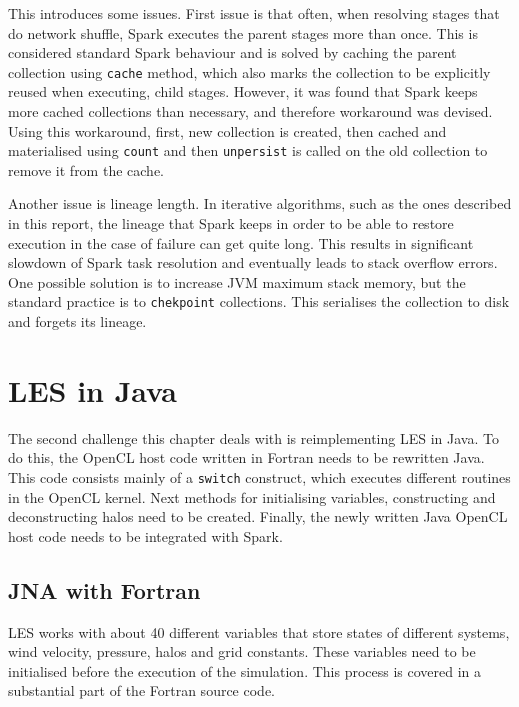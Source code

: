 \documentclass{l4proj}
\begin{document}
This introduces some issues. First issue is that often, when resolving stages that
do network shuffle, Spark executes the parent stages more than once. This is
considered standard Spark behaviour and is solved by caching the parent collection
using \texttt{cache} method, which also marks the collection to be explicitly reused
when executing, child stages. However, it was found that Spark keeps more cached collections
than necessary, and therefore workaround was devised. Using this workaround, first,
new collection is created, then cached and materialised using \texttt{count} and 
then \texttt{unpersist} is called on the old collection to remove it from the cache.

Another issue is lineage length. In iterative algorithms, such as the ones described 
in this report, the lineage that Spark keeps in order to be able to restore execution
in the case of failure can get quite long. This results in significant slowdown of
Spark task resolution and eventually leads to stack overflow errors. One possible
solution is to increase JVM maximum stack memory, but the standard practice is to
\texttt{chekpoint} collections. This serialises the collection to disk and forgets
its lineage.

\chapter{LES in Java}
\label{chap:les_java}

The second challenge this chapter deals with is reimplementing LES in Java.
To do this, the OpenCL host code written in Fortran needs to be rewritten 
Java. This code consists mainly of a \texttt{switch} construct, which executes
different routines in the OpenCL kernel. Next methods for initialising variables,
constructing and deconstructing halos need to be created. Finally, the newly 
written Java OpenCL host code needs to be integrated with Spark.

\section{JNA with Fortran}

LES works with about 40 different variables that store states of different systems,
wind velocity, pressure, halos and grid constants. These variables need to be initialised
before the execution of the simulation. This process is covered in a substantial part of
the Fortran source code.
\end{document}
